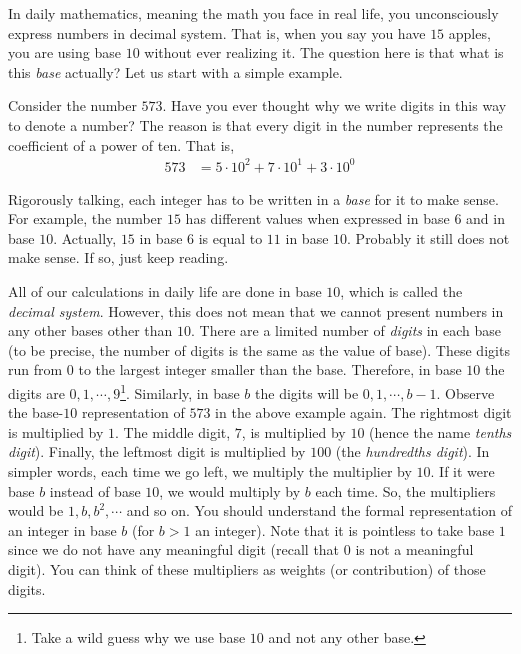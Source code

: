 \documentclass{subfile}
\begin{document}
	In daily mathematics, meaning the math you face in real life, you unconsciously express numbers in decimal system. That is, when you say you have $15$ apples, you are using base $10$ without ever realizing it. The question here is that what is this \textit{base} actually? Let us start with a simple example.
		\begin{example}
			Consider the number $573$. Have you ever thought why we write digits in this way to denote a number? The reason is that every digit in the number represents the coefficient of a power of ten. That is,
			\begin{align*}
				573
					& = 5 \cdot 10^2 + 7 \cdot 10^1 + 3 \cdot 10^0
			\end{align*}
		\end{example}
	Rigorously talking, each integer has to be written in a \textit{base} for it to make sense. For example, the number $15$ has different values when expressed in base $6$ and in base $10$. Actually, $15$ in base $6$ is equal to $11$ in base $10$. Probably it still does not make sense. If so, just keep reading.

	All of our calculations in daily life are done in base $10$, which is called the \textit{decimal system}. However, this does not mean that we cannot present numbers in any other bases other than $10$. There are a limited number of \textit{digits} in each base (to be precise, the number of digits is the same as the value of base). These digits run from $0$ to the largest integer smaller than the base. Therefore, in base $10$ the digits are $0,1,\cdots,9$\footnote{Take a wild guess why we use base $10$ and not any other base.}. Similarly, in base $b$ the digits will be $0,1,\cdots,b-1$. Observe the base-$10$ representation of $573$ in the above example again. The rightmost digit is multiplied by $1$. The middle digit, $7$, is multiplied by $10$ (hence the name \textit{tenths digit}). Finally, the leftmost digit is multiplied by $100$ (the \textit{hundredths digit}). In simpler words, each time we go left, we multiply the multiplier by $10$. If it were base $b$ instead of base $10$, we would multiply by $b$ each time. So, the multipliers would be $1,b,b^2,\cdots$ and so on. You should understand the formal representation of an integer in base $b$ (for $b>1$ an integer). Note that it is pointless to take base $1$ since we do not have any meaningful digit (recall that $0$ is not a meaningful digit). You can think of these multipliers as weights (or contribution) of those digits.
\end{document}
